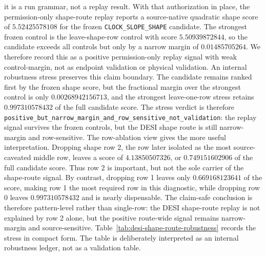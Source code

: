 \documentclass[11pt]{article}
\begin{document}
it is a run grammar, not a replay result.
With that authorization in place, the permission-only shape-route replay reports
a source-native quadratic shape score of \(5.52425578108\) for the frozen
\texttt{CLOCK\_\allowbreak{}SLOPE\_\allowbreak{}SHAPE} candidate. The strongest frozen control is the
leave-shape-row control with score \(5.50939872844\), so the candidate exceeds
all controls but only by a narrow margin of \(0.01485705264\). We therefore
record this as a positive permission-only replay signal with weak
control-margin, not as endpoint validation or physical validation.
An internal robustness stress preserves this claim boundary. The candidate
remains ranked first by the frozen shape score, but the fractional margin over
the strongest control is only \(0.00268942156713\), and the strongest
leave-one-row stress retains \(0.997310578432\) of the full candidate score.
The stress verdict is therefore
\texttt{positive\_\allowbreak{}but\_\allowbreak{}narrow\_\allowbreak{}margin\_\allowbreak{}and\_\allowbreak{}row\_\allowbreak{}sensitive\_\allowbreak{}not\_\allowbreak{}validation}:
the replay signal survives the frozen controls, but the DESI shape route is
still narrow-margin and row-sensitive.
The row-ablation view gives the more useful interpretation.  Dropping shape row
2, the row later isolated as the most source-caveated middle row, leaves a
score of \(4.13850507326\), or \(0.749151602906\) of the full candidate score.
Thus row 2 is important, but not the sole carrier of the shape-route signal.
By contrast, dropping row 1 leaves only \(0.669168123641\) of the score, making
row 1 the most required row in this diagnostic, while dropping row 0 leaves
\(0.997310578432\) and is nearly dispensable.  The claim-safe conclusion is
therefore pattern-level rather than single-row: the DESI shape-route replay is
not explained by row 2 alone, but the positive route-wide signal remains
narrow-margin and source-sensitive.
Table~\ref{tab:desi-shape-route-robustness} records the stress in compact
form. The table is deliberately interpreted as an internal robustness ledger,
not as a validation table.
\end{document}
